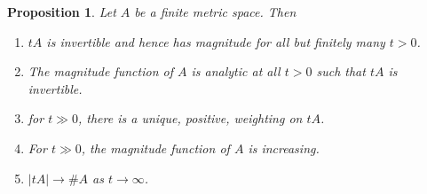 \documentclass[11pt]{article}
\theoremstyle{mythm}
\newtheorem{prop}[defn]{Proposition}
\begin{document}
\begin{prop}\label{prop:approach}
Let $A$ be a finite metric space. Then
\begin{enumerate}[label=(\roman*)]
\item $tA$ is invertible and hence has magnitude for all but finitely many $t > 0$.
\item The magnitude function of $A$ is analytic at all $t>0$ such that $tA$ is invertible.
\item for $t \gg 0$, there is a unique, positive, weighting on $tA$.
\item For $t \gg 0$, the magnitude function of $A$ is increasing.
\item $\vert tA \vert \to \#A$ as $t \to \infty$.
\end{enumerate}
\end{prop}
\end{document}
